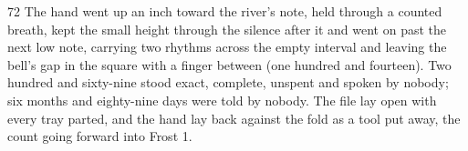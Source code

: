 \begin{CRchronicle}{72}
The hand went up an inch toward the river’s note, held through a counted breath, kept the small height through the silence after it and went on past the next low note, carrying two rhythms across the empty interval and leaving the bell’s gap in the square with a finger between (one hundred and fourteen). Two hundred and sixty-nine stood exact, complete, unspent and spoken by nobody; six months and eighty-nine days were told by nobody. The file lay open with every tray parted, and the hand lay back against the fold as a tool put away, the count going forward into Frost 1.
\end{CRchronicle}
